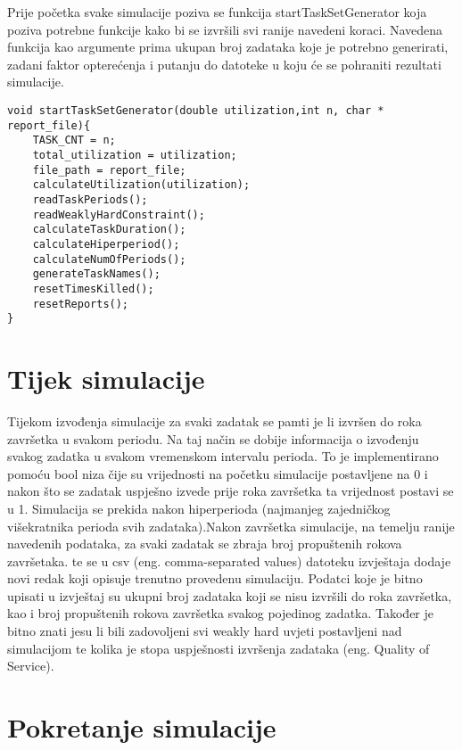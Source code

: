 \documentclass[../zavrsni.tex]{subfiles}
\begin{document}
Prije početka svake simulacije poziva se funkcija startTaskSetGenerator koja poziva potrebne funkcije kako bi se izvršili 
svi ranije navedeni koraci. Navedena funkcija kao argumente prima ukupan broj zadataka koje je potrebno generirati, zadani 
faktor opterećenja i putanju do datoteke u koju će se pohraniti rezultati simulacije.
\begin{lstlisting}[style=CStyle,caption={Funckija startTaskSetGenerator},captionpos=b]
void startTaskSetGenerator(double utilization,int n, char * report_file){
    TASK_CNT = n; 
    total_utilization = utilization; 
    file_path = report_file;
    calculateUtilization(utilization);
    readTaskPeriods();
    readWeaklyHardConstraint();
    calculateTaskDuration();
    calculateHiperperiod();
    calculateNumOfPeriods();
    generateTaskNames();
    resetTimesKilled();
    resetReports();
}
\end{lstlisting}
\section{Tijek simulacije}

Tijekom izvođenja simulacije za svaki zadatak se pamti je li izvršen do roka završetka u svakom periodu. 
Na taj način se dobije informacija o izvođenju svakog zadatka u svakom vremenskom intervalu perioda. To je implementirano 
pomoću bool niza čije su vrijednosti na početku simulacije postavljene na 0 i nakon što se zadatak uspješno izvede 
prije roka završetka ta vrijednost postavi se u 1. Simulacija se prekida nakon hiperperioda (najmanjeg zajedničkog višekratnika perioda 
svih zadataka).Nakon završetka simulacije, na temelju ranije navedenih podataka, za svaki zadatak se zbraja broj propuštenih rokova završetaka.
te se u csv (eng. comma-separated values) datoteku izvještaja dodaje novi redak koji opisuje trenutno provedenu simulaciju. 
Podatci koje je bitno upisati u izvještaj su ukupni broj zadataka koji se nisu izvršili do roka završetka, kao i broj propuštenih rokova 
završetka svakog pojedinog zadatka. Također je bitno znati jesu li bili zadovoljeni svi weakly hard uvjeti 
postavljeni nad simulacijom te kolika je stopa uspješnosti izvršenja zadataka (eng. Quality of Service). 

\section{Pokretanje simulacije}
\end{document}

